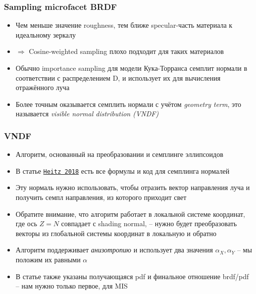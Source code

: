 \documentclass[10pt]{beamer}
\begin{document}
\begin{frame}
\frametitle{Sampling microfacet BRDF}
\begin{itemize}
\item Чем меньше значение roughness, тем ближе specular-часть материала к идеальному зеркалу
\pause
\item \begin{math}\Longrightarrow\end{math} Cosine-weighted sampling плохо подходит для таких материалов
\pause
\item Обычно importance sampling для модели Кука-Торранса семплит нормали в соответствии с распределением D, и использует их для вычисления отражённого луча
\pause
\item Более точным оказывается семплить нормали с учётом \textit{geometry term}, это называется \textit{visible normal distribution (VNDF)}
\end{itemize}
\end{frame}

\begin{frame}
\frametitle{VNDF}
\begin{itemize}
\item Алгоритм, основанный на преобразовании и семплинге эллипсоидов
\pause
\item В статье \href{https://jcgt.org/published/0007/04/01/paper.pdf}{\texttt{Heitz 2018}} есть все формулы и код для семплинга нормалей
\pause
\item Эту нормаль нужно использовать, чтобы отразить вектор направления луча и получить семпл направления, из которого приходит свет
\pause
\item Обратите внимание, что алгоритм работает в локальной системе координат, где ось \begin{math}Z = N\end{math} совпадает с shading normal, -- нужно будет преобразовать векторы из глобальной системы координат в локальную и обратно
\pause
\item Алгоритм поддерживает \textit{анизотропию} и использует два значения \begin{math}\alpha_X, \alpha_Y\end{math} -- мы положим их равными \begin{math}\alpha\end{math}
\pause
\item В статье также указаны получающаяся pdf и финальное отношение brdf/pdf -- нам нужно только первое, для MIS
\end{itemize}
\end{frame}
\end{document}

